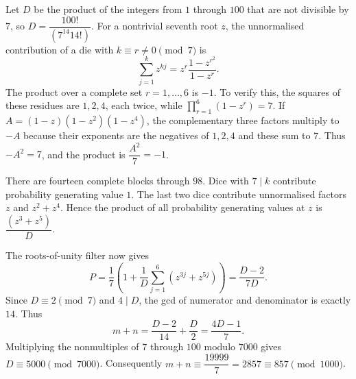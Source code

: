 Let $D$ be the product of the integers from $1$ through $100$ that are not divisible by $7$, so $D=\dfrac{100!}{(7^{14}14!)}$. For a nontrivial seventh root $z$, the unnormalised contribution of a die with $k\equiv r\ne0\pmod7$ is
\[
\sum_{j=1}^{k}z^{kj}=z^r\dfrac{1-z^{r^2}}{1-z^r}.
\]
The product over a complete set $r=1,\ldots,6$ is $-1$. To verify this, the squares of these residues are $1,2,4$, each twice, while $\prod_{r=1}^6(1-z^r)=7$. If $A=(1-z)(1-z^2)(1-z^4)$, the complementary three factors multiply to $-A$ because their exponents are the negatives of $1,2,4$ and these sum to $7$. Thus $-A^2=7$, and the product is $\dfrac{A^2}{7}=-1$.

There are fourteen complete blocks through $98$. Dice with $7\mid k$ contribute probability generating value $1$. The last two dice contribute unnormalised factors $z$ and $z^2+z^4$. Hence the product of all probability generating values at $z$ is $\dfrac{(z^3+z^5)}{D}$.

The roots-of-unity filter now gives
\[
P=\dfrac{1}{7}\left(1+\dfrac{1}{D}\sum_{j=1}^6(z^{3j}+z^{5j})\right)
=\dfrac{D-2}{7D}.
\]
Since $D\equiv2\pmod7$ and $4\mid D$, the gcd of numerator and denominator is exactly $14$. Thus
\[
m+n=\dfrac{D-2}{14}+\dfrac{D}{2}=\dfrac{4D-1}{7}.
\]
Multiplying the nonmultiples of $7$ through $100$ modulo $7000$ gives $D\equiv5000\pmod{7000}$. Consequently $m+n\equiv\dfrac{19999}{7}=2857\equiv\boxed{857}\pmod{1000}$.
